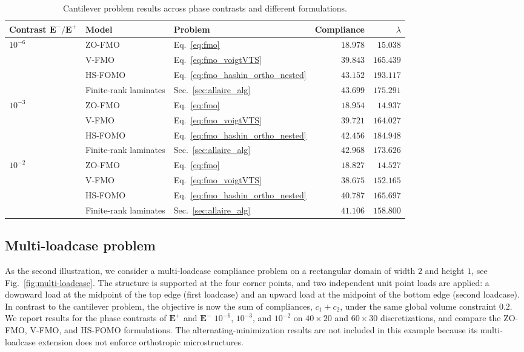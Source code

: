 \documentclass[preprint,3p]{elsarticle}
\newcommand{\tensf}[1]{\bm{\mathbf{#1}}}            %
\newcommand{\Emin}{\tensf{E}^{-}}                   %
\newcommand{\Emax}{\tensf{E}^{+}}                   %
\begin{document}
\begin{table}[!t]
\centering
\small
\setlength{\tabcolsep}{6pt}
\begin{tabular}{l l l r r}
\hline
Contrast $\Emin/\Emax$ & Model & Problem & Compliance & $\lambda$ \\
\hline
$10^{-6}$ & ZO-FMO & Eq.~\eqref{eq:fmo} & $18.978$ & $15.038$ \\
 & V-FMO & Eq.~\eqref{eq:fmo_voigtVTS} & $39.843$ & $165.439$ \\
 & HS-FOMO & Eq.~\eqref{eq:fmo_hashin_ortho_nested} & $43.152$ & $193.117$ \\
 & Finite-rank laminates & Sec.~\ref{sec:allaire_alg} & $43.699$ & $175.291$ \\
\hline
$10^{-3}$ & ZO-FMO & Eq.~\eqref{eq:fmo} & $18.954$ & $14.937$ \\
 & V-FMO & Eq.~\eqref{eq:fmo_voigtVTS} & $39.721$ & $164.027$ \\
 & HS-FOMO & Eq.~\eqref{eq:fmo_hashin_ortho_nested} & $42.456$ & $184.948$ \\
 & Finite-rank laminates & Sec.~\ref{sec:allaire_alg} & $42.968$ & $173.626$ \\
\hline
$10^{-2}$ & ZO-FMO & Eq.~\eqref{eq:fmo} & $18.827$ & $14.527$ \\
 & V-FMO & Eq.~\eqref{eq:fmo_voigtVTS} & $38.675$ & $152.165$ \\
 & HS-FOMO & Eq.~\eqref{eq:fmo_hashin_ortho_nested} & $40.787$ & $165.697$ \\
 & Finite-rank laminates & Sec.~\ref{sec:allaire_alg} & $41.106$ & $158.800$ \\
\hline
\end{tabular}
\caption{Cantilever problem results across phase contrasts and different formulations.}
\label{tab:cantilever_phase_contrast_summary}
\end{table}


\subsection{Multi-loadcase problem}

As the second illustration, we consider a multi-loadcase compliance problem on a rectangular domain of width $2$ and height $1$, see Fig.~\ref{fig:multi-loadcase}. The structure is supported at the four corner points, and two independent unit point loads are applied: a downward load at the midpoint of the top edge (first loadcase) and an upward load at the midpoint of the bottom edge (second loadcase). In contrast to the cantilever problem, the objective is now the sum of compliances, $c_1+c_2$, under the same global volume constraint $0.2$. We report results for the phase contrasts of $\Emax$ and $\Emin$ $10^{-6}$, $10^{-3}$, and $10^{-2}$ on $40\times20$ and $60\times30$ discretizations, and compare the ZO-FMO, V-FMO, and HS-FOMO formulations. The alternating-minimization results are not included in this example because its multi-loadcase extension \citep{Allaire1996} does not enforce orthotropic microstructures.
\end{document}
